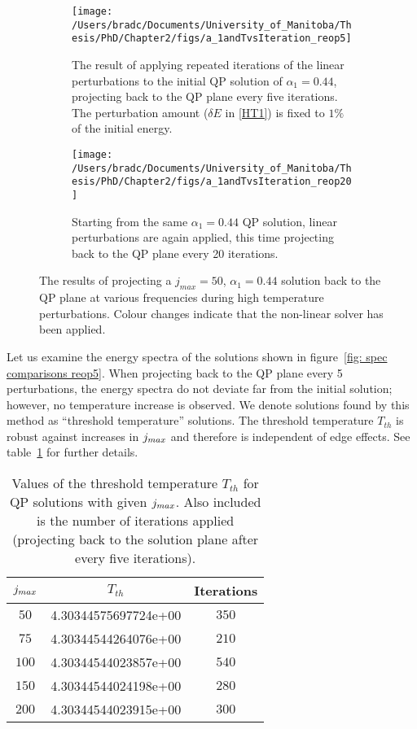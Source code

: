 \documentclass[../PhD.tex]{subfiles}
\begin{document}
\begin{figure}[h]
	\centering
	\begin{subfigure}[t]{0.45\textwidth}
		\texttt{[image: /Users/bradc/Documents/University\_of\_Manitoba/Thesis/PhD/Chapter2/figs/a\_1andTvsIteration\_reop5]}
		\caption{The result of applying repeated iterations of the linear perturbations to the initial QP solution of $\alpha_1=0.44$, projecting back to the QP plane every five iterations. The perturbation amount ($\delta E$ in \eqref{HT1}) is fixed to $1\%$ of the initial energy.}
		\label{fig: a_1andTa0.2reop5}
	\end{subfigure}
	\:
	\begin{subfigure}[t]{0.45\textwidth}
		\texttt{[image: /Users/bradc/Documents/University\_of\_Manitoba/Thesis/PhD/Chapter2/figs/a\_1andTvsIteration\_reop20]}
		\caption{Starting from the same $\alpha_1=0.44$ QP solution, linear perturbations are again applied, this time projecting back to the QP plane every 20 iterations.}
		\label{fig: a_1andTa.2reop20}
	\end{subfigure}
	\caption{The results of projecting a $j_{max}=50$, $\alpha_1 = 0.44$ solution back to the QP plane at various frequencies during high temperature perturbations. Colour changes indicate that the non-linear solver has been applied.}
	\label{fig: reop comparisons}
\end{figure}

Let us examine the energy spectra of the solutions shown in figure~\ref{fig: spec comparisons reop5}. When projecting back to the QP plane every 5 perturbations, the energy spectra do not deviate far from the initial solution; however, no temperature increase is observed. We denote solutions found by this method as ``threshold temperature'' solutions. The threshold temperature $T_{th}$ is robust against increases in $j_{max}$ and therefore is independent of edge effects. See table~\ref{tab: T_thresh} for further details.

\begin{table}
	\centering
	\begin{tabular}[t]{|c|c|c|}
		\hline
		$j_{max}$ & $T_{th}$ & Iterations \\ \hline
		$50$ & 4.30344575697724e+00 & $350$ \\ \hline
		$75$ & 4.30344544264076e+00 & $210$ \\ \hline
		$100$ & 4.30344544023857e+00 & $540$ \\ \hline
		$150$ & 4.30344544024198e+00 & $280$ \\ \hline
		$200$ & 4.30344544023915e+00 & $300$ \\ \hline
	\end{tabular}
	\caption{Values of the threshold temperature $T_{th}$ for QP solutions with given $j_{max}$. Also included is the number of iterations applied (projecting back to the solution plane after every five iterations).}
	\label{tab: T_thresh}
\end{table}
\end{document}
